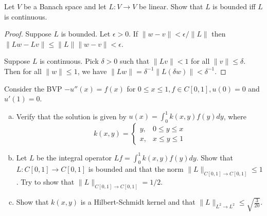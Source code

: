 \documentclass{article}
\begin{document}
 Let $V$ be a Banach space and let $L : V \to V$ be linear. Show that $L$ is bounded iff $L$ is continuous.
\begin{proof}
Suppose $L$ is bounded. Let $\epsilon > 0$. If $\|w - v\| < \epsilon/\|L\|$ then $\|Lw - Lv\| \le \|L\|\|w - v\| < \epsilon$.

Suppose $L$ is continuous.  Pick $\delta > 0$ such that $\|Lv\| < 1$ for all $\|v\| \le \delta$.  Then for all $\|w\| \le 1$, we have $\|Lw\| = \delta^{-1} \|L (\delta w ) \| < \delta^{-1}$.
\end{proof}

 Consider the BVP $-u''(x) = f(x)$ for $0 \le x \le 1, f \in C[0,1], u(0) = 0$ and $u'(1) = 0$.
\begin{enumerate}[a.]
\item Verify that the solution is given by $u(x) = \int_0^1 k(x,y) f(y) dy$, where
$$ k(x,y) = \left\{ \begin{array}{cc}
   y, & 0 \le y \le x
\\ x, & x \le y \le 1
\end{array}\right. 
$$
\item Let $L$ be the integral operator $Lf = \int_0^1 k(x,y)f(y) dy$. Show that $L: C[0,1] \to C[0,1]$ is bounded and that the norm $\|L\|_{C[0,1] \to C[0,1]} \le 1$. Try to show that $\|L\|_{C[0,1] \to C[0,1]} = 1/2$.
\item Show that $k(x,y)$ is a Hilbert-Schmidt kernel and that $\|L\|_{L^2 \to L^2} \le \sqrt{\frac 3 {20}}$.
\end{enumerate}
\end{document}
